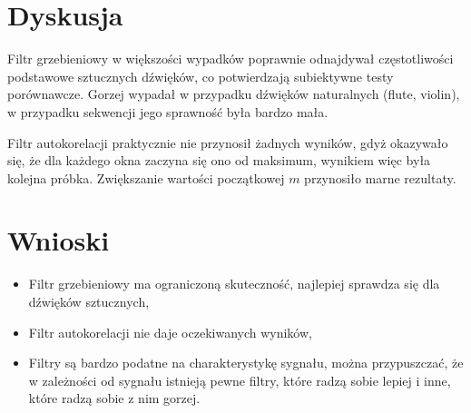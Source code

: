 \documentclass{classrep}
\begin{document}
\section{Dyskusja}
Filtr grzebieniowy w większości wypadków poprawnie odnajdywał częstotliwości podstawowe sztucznych dźwięków, co potwierdzają subiektywne testy porównawcze. Gorzej wypadał w przypadku dźwięków naturalnych (flute, violin), w przypadku sekwencji jego sprawność była bardzo mała.

Filtr autokorelacji praktycznie nie przynosił żadnych wyników, gdyż okazywało się, że dla każdego okna zaczyna się ono od maksimum, wynikiem więc była kolejna próbka. Zwiększanie wartości początkowej $m$ przynosiło marne rezultaty.

\section{Wnioski}
\begin{itemize}
 \item Filtr grzebieniowy ma ograniczoną skuteczność, najlepiej sprawdza się dla dźwięków sztucznych,
 \item Filtr autokorelacji nie daje oczekiwanych wyników,
 \item Filtry są bardzo podatne na charakterystykę sygnału, można przypuszczać, że w zależności od sygnału istnieją pewne filtry, które radzą sobie lepiej i inne, które radzą sobie z nim gorzej.
\end{itemize}
\end{document}
